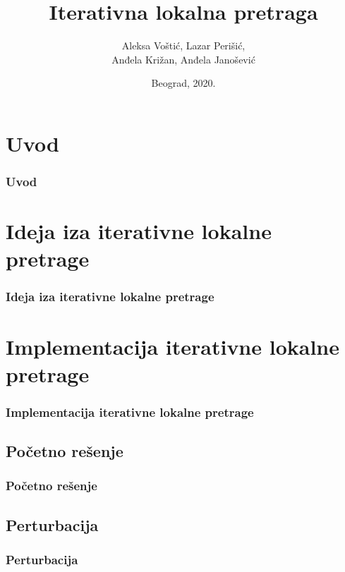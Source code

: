 \documentclass{beamer}
\begin{document}
\title{Iterativna lokalna pretraga}
\author[]{Aleksa Voštić, Lazar Perišić,\\ Anđela Križan, Anđela Janošević}
\date{
	\footnotesize{Beograd, 2020.}	
}

\begin{frame}
	\thispagestyle{empty}
	\titlepage
\end{frame}


\section*{Uvod}
\begin{frame}[fragile]
    \frametitle{Uvod}

\end{frame}

\section{Ideja iza iterativne lokalne pretrage}
\begin{frame}
	\frametitle{Ideja iza iterativne lokalne pretrage} 

\end{frame}

\section{Implementacija iterativne lokalne pretrage}
\begin{frame}[fragile]\frametitle{Implementacija iterativne lokalne pretrage}
 
\end{frame}

\subsection{Početno rešenje}
\begin{frame}[fragile]\frametitle{Početno rešenje}

\end{frame}

\subsection{Perturbacija}
\begin{frame}[fragile]\frametitle{Perturbacija}

\end{frame}
\end{document}

